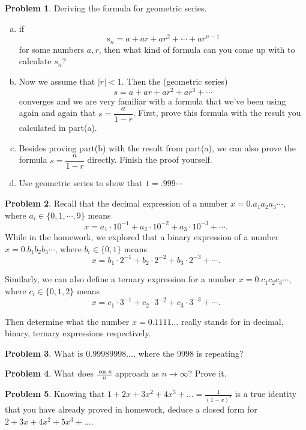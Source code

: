\documentclass[11pt,oneside]{amsart}
\theoremstyle{definition}
\newtheorem{problem}{Problem}
\begin{document}
\begin{problem} Deriving the formula for geometric series.
\begin{enumerate}[(a)]
  \item if
        \[s_n=a+ar+ar^2+\cdots+ar^{n-1}\]
        for some numbers $a,r$, then what kind of formula can you come up with to calculate $s_n$?
  \item Now we assume that $|r|<1$. Then the (geometric series)
        \[s=a+ar+ar^2+ar^3+\cdots\]
        converges and we are very familiar with a formula that we've been using again and again that $s=\dfrac{a}{1-r}$. First, prove this formula with the result you calculated in part(a).
  \item Besides proving part(b) with the result from part(a), we can also prove the formula $s=\dfrac{a}{1-r}$ directly. Finish the proof yourself.
  \item Use geometric series to show that $1=.999\cdots$
\end{enumerate}
\end{problem}

\begin{problem}
Recall that the decimal expression of a number $x=0.a_1a_2a_3\cdots$, where $a_i \in \{0,1,\cdots,9\}$ means
\[x=a_1\cdot 10^{-1}+a_2\cdot 10^{-2}+a_3\cdot 10^{-3}+\cdots.\]
While in the homework, we explored that a binary expression of a number $x=0.b_1b_2b_3\cdots$, where $b_i \in \{0,1\}$ means
\[x=b_1\cdot 2^{-1}+b_2\cdot 2^{-2}+b_3\cdot 2^{-3}+\cdots.\]

Similarly, we can also define a ternary expression for a number $x=0.c_1c_2c_3\cdots$, where $c_i \in \{0,1,2\}$ means
\[x=c_1\cdot 3^{-1}+c_2\cdot 3^{-2}+c_3\cdot 3^{-3}+\cdots.\]

Then determine what the number $x=0.1111\ldots$ really stands for in decimal, binary, ternary expressions respectively.
\end{problem}

\begin{problem}
What is $0.99989998\ldots$, where the 9998 is repeating?
\end{problem}

\begin{problem}
What does $\frac{\cos n}n$ approach as $n\to\infty$? Prove it.
\end{problem}

\begin{problem}\label{problem:p8}
Knowing that $1+2x+3x^2+4x^3+\dots=\frac 1{(1-x)^2}$ is a true identity that you have already proved in homework, deduce a closed form for $2+3x+4x^2+5x^3+\dots$.
\end{problem}
\end{document}
